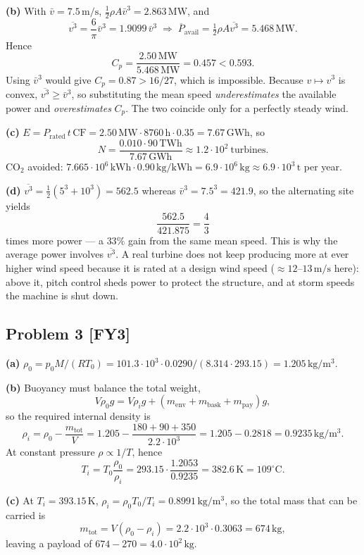 \documentclass[11pt,a4paper]{article}
\newcommand{\problem}[2]{\subsection*{Problem #1 \; \textnormal{\small[#2]}}}
\newcommand{\unit}[1]{\,\mathrm{#1}}
\begin{document}
\textbf{(b)} With $\bar v=7.5\unit{m/s}$,
$\tfrac12\rho A\bar v^3=2.863\unit{MW}$, and
\[
  \overline{v^3}=\frac6\pi\bar v^3 = 1.9099\,\bar v^3
  \;\Longrightarrow\;
  \overline{P}_{\text{avail}}=\tfrac12\rho A\overline{v^3}=5.468\unit{MW}.
\]
Hence
\[
  C_p = \frac{2.50\unit{MW}}{5.468\unit{MW}} = \boxed{0.457} < 0.593 .
\]
Using $\bar v^3$ would give $C_p=0.87>16/27$, which is impossible. Because
$v\mapsto v^3$ is convex, $\overline{v^3}\ge\bar v^3$, so substituting the
mean speed \emph{underestimates} the available power and
\emph{overestimates} $C_p$. The two coincide only for a perfectly steady
wind.

\textbf{(c)} $E=P_{\text{rated}}\,t\,\text{CF}
=2.50\unit{MW}\cdot8760\unit{h}\cdot0.35=7.67\unit{GWh}$, so
\[
  N=\frac{0.010\cdot90\unit{TWh}}{7.67\unit{GWh}} \approx
  \boxed{1.2\cdot10^{2}\ \text{turbines}} .
\]
CO$_2$ avoided: $7.665\cdot10^{6}\unit{kWh}\cdot0.90\unit{kg/kWh}
=6.9\cdot10^{6}\unit{kg} \approx \boxed{6.9\cdot10^{3}\unit{t}}$ per year.

\textbf{(d)} $\overline{v^3}=\tfrac12(5^3+10^3)=562.5$ whereas
$\bar v^3=7.5^3=421.9$, so the alternating site yields
\[
  \frac{562.5}{421.875}=\boxed{\frac43}
\]
times more power --- a $33\%$ gain from the same mean speed. This is why
the average power involves $\overline{v^3}$. A real turbine does not keep
producing more at ever higher wind speed because it is rated at a design
wind speed ($\approx12$--$13\unit{m/s}$ here): above it, pitch control sheds
power to protect the structure, and at storm speeds the machine is shut
down.

\problem{3}{FY3}
\textbf{(a)} $\rho_0=p_0M/(RT_0)
=101.3\cdot10^{3}\cdot0.0290/(8.314\cdot293.15)
=\boxed{1.205\unit{kg/m^3}}$.

\textbf{(b)} Buoyancy must balance the total weight,
\[
  V\rho_0 g = V\rho_i g + (m_{\text{env}}+m_{\text{bask}}+m_{\text{pay}})g,
\]
so the required internal density is
\[
  \rho_i=\rho_0-\frac{m_{\text{tot}}}{V}
  =1.205-\frac{180+90+350}{2.2\cdot10^3}
  =1.205-0.2818=0.9235\unit{kg/m^3}.
\]
At constant pressure $\rho\propto1/T$, hence
\[
  T_i=T_0\frac{\rho_0}{\rho_i}=293.15\cdot\frac{1.2053}{0.9235}
  =382.6\unit{K}=\boxed{109^\circ\text{C}}.
\]

\textbf{(c)} At $T_i=393.15\unit{K}$,
$\rho_i=\rho_0T_0/T_i=0.8991\unit{kg/m^3}$, so the total mass that can be
carried is
\[
  m_{\text{tot}}=V(\rho_0-\rho_i)=2.2\cdot10^{3}\cdot0.3063=674\unit{kg},
\]
leaving a payload of $674-270=\boxed{4.0\cdot10^{2}\unit{kg}}$.
\end{document}
